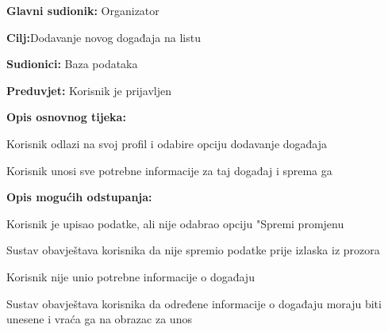 				\noindent {}
				\begin{packed_item}
					
					\item \textbf{Glavni sudionik: }Organizator
					\item  \textbf{Cilj:}Dodavanje novog događaja na listu
					\item  \textbf{Sudionici:} Baza podataka
					\item  \textbf{Preduvjet:} Korisnik je prijavljen
					\item  \textbf{Opis osnovnog tijeka:}
					
					\item[] \begin{packed_enum}
						
						\item Korisnik odlazi na svoj profil i odabire opciju dodavanje događaja
						\item Korisnik unosi sve potrebne informacije za taj događaj i sprema ga
					\end{packed_enum}
					
					\item  \textbf{Opis mogućih odstupanja:}
					
					\item[] \begin{packed_item}
						
						\item[3.a] Korisnik je upisao podatke, ali nije odabrao opciju "Spremi promjenu
						\item[] \begin{packed_enum}
							\item Sustav obavještava korisnika da nije spremio podatke prije izlaska iz prozora
						\end{packed_enum}
						
						\item[3.b] Korisnik nije unio potrebne informacije o događaju
						\item[] \begin{packed_enum}
							\item Sustav obavještava korisnika da određene informacije o događaju moraju biti unesene i vraća ga na obrazac za unos
						\end{packed_enum}
						
					\end{packed_item}
				\end{packed_item}
				

